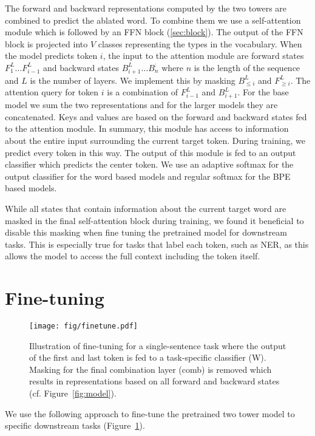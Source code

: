 \documentclass[11pt,a4paper]{article}
\begin{document}
The forward and backward representations computed by the two towers are combined to predict the ablated word.
To combine them we use a self-attention module which is followed by an FFN block (\textsection\ref{sec:block}).
The output of the FFN block is projected into $V$ classes representing the types in the vocabulary. 
When the model predicts token $i$, the input to the attention module are forward states $F^L_1 \dots F^L_{i-1}$ and backward states $B^L_{i+1} \dots B^:_n$ where $n$ is the length of the sequence and $L$ is the number of layers.
We implement this by masking $B^L_{\le i}$ and $F^L_{\ge i}$.
The attention query for token $i$ is a combination of $F^L_{i-1}$ and $B^L_{i+1}$.
For the base model we sum the two representations and for the larger models they are concatenated.
Keys and values are based on the forward and backward states fed to the attention module.
In summary, this module has access to information about the entire input surrounding the current target token.
During training, we predict every token in this way.
The output of this module is fed to an output classifier which predicts the center token. 
We use an adaptive softmax for the output classifier \citep{grave2017icml} for the word based models and regular softmax for the BPE based models.

While all states that contain information about the current target word are masked in the final self-attention block during training, we found it beneficial to disable this masking when fine tuning the pretrained model for downstream tasks. 
This is especially true for tasks that label each token, such as NER, as this allows the model to access the full context including the token itself.


\section{Fine-tuning}

\begin{figure}[t]
\centering
\texttt{[image: fig/finetune.pdf]}
\caption{Illustration of fine-tuning for a single-sentence task where the output of the first and last token is fed to a task-specific classifier (W).
Masking for the final combination layer (comb) is removed which results in representations based on all forward and backward states (cf. Figure~\ref{fig:model}).
}
\label{fig:finetune}
\end{figure}

We use the following approach to fine-tune the pretrained two tower model to specific downstream tasks (Figure~\ref{fig:finetune}).
\end{document}
